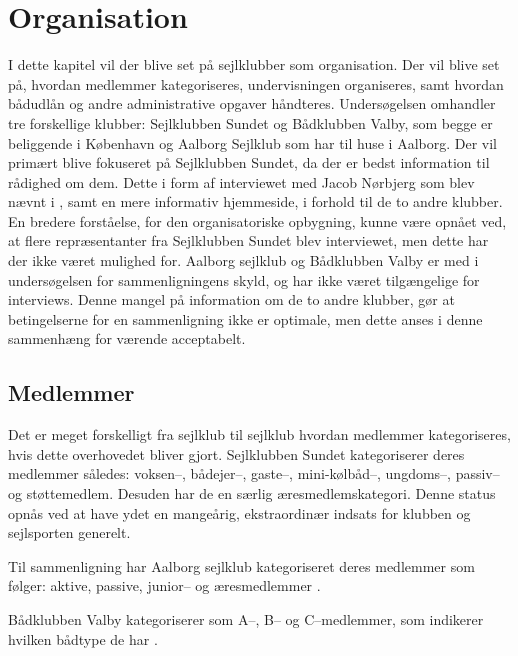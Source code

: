 \chapter{Organisation}\label{chap:organisation}

I dette kapitel vil der blive set på sejlklubber som organisation. 
Der vil blive set på, hvordan medlemmer kategoriseres, undervisningen organiseres, samt hvordan bådudlån og andre administrative opgaver håndteres. 
Undersøgelsen omhandler tre forskellige klubber: Sejlklubben Sundet og Bådklubben Valby, som begge er beliggende i København og Aalborg Sejlklub som har til huse i Aalborg. 
Der vil primært blive fokuseret på Sejlklubben Sundet, da der er bedst information til rådighed om dem. 
Dette i form af interviewet med Jacob Nørbjerg som blev nævnt i , samt en mere informativ hjemmeside, i forhold til de to andre klubber. 
En bredere forståelse, for den organisatoriske opbygning, kunne være opnået ved, at flere repræsentanter fra Sejlklubben Sundet blev interviewet, men dette har der ikke været mulighed for.
Aalborg sejlklub og Bådklubben Valby er med i undersøgelsen for sammenligningens skyld, og har ikke været tilgængelige for interviews. 
Denne mangel på information om de to andre klubber, gør at betingelserne for en sammenligning ikke er optimale, men dette anses i denne sammenhæng for værende acceptabelt. 

\section{Medlemmer}\label{sec:organisation-medlemmer}

Det er meget forskelligt fra sejlklub til sejlklub hvordan medlemmer kategoriseres, hvis dette overhovedet bliver gjort.
Sejlklubben Sundet kategoriserer deres medlemmer således: voksen--, bådejer--, gaste--, mini-kølbåd--,
ungdoms--, passiv-- og støttemedlem. 
Desuden har de en særlig æresmedlemskategori. Denne status opnås ved at have ydet en mangeårig, ekstraordinær indsats for klubben og sejlsporten generelt.\citep{sundet_vedtaegter}

Til sammenligning har Aalborg sejlklub kategoriseret deres medlemmer som følger: aktive, passive, junior-- og
æresmedlemmer \citep{aalborg_sejlklub_vedtaegter}.

Bådklubben Valby kategoriserer som A--, B-- og C--medlemmer, som indikerer hvilken bådtype de har
\citep{badklubben_valby_love}.

